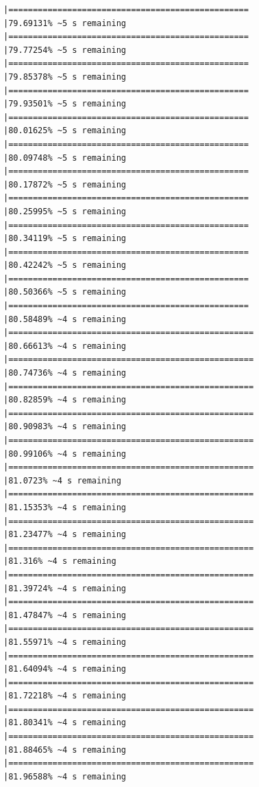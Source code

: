 \documentclass{article}\usepackage[]{graphicx}\usepackage[]{xcolor}
\makeatletter
\newenvironment{kframe}{%
 \def\at@end@of@kframe{}%
 \ifinner\ifhmode%
  \def\at@end@of@kframe{\end{minipage}}%
  \begin{minipage}{\columnwidth}%
 \fi\fi%
 \def\FrameCommand##1{\hskip\@totalleftmargin \hskip-\fboxsep
 \colorbox{shadecolor}{##1}\hskip-\fboxsep
     \hskip-\linewidth \hskip-\@totalleftmargin \hskip\columnwidth}%
 \MakeFramed {\advance\hsize-\width
   \@totalleftmargin\z@ \linewidth\hsize
   \@setminipage}}%
 {\par\unskip\endMakeFramed%
 \at@end@of@kframe}
\newenvironment{knitrout}{}{} %
\makeatother
\begin{document}
\begin{knitrout}
\begin{kframe}
\begin{verbatim}
|=================================================             |79.69131% ~5 s remaining  
|=================================================             |79.77254% ~5 s remaining  
|=================================================             |79.85378% ~5 s remaining  
|=================================================             |79.93501% ~5 s remaining  
|=================================================             |80.01625% ~5 s remaining  
|=================================================             |80.09748% ~5 s remaining  
|=================================================             |80.17872% ~5 s remaining  
|=================================================             |80.25995% ~5 s remaining  
|=================================================             |80.34119% ~5 s remaining  
|=================================================             |80.42242% ~5 s remaining  
|=================================================             |80.50366% ~5 s remaining  
|=================================================             |80.58489% ~4 s remaining  
|==================================================            |80.66613% ~4 s remaining  
|==================================================            |80.74736% ~4 s remaining  
|==================================================            |80.82859% ~4 s remaining  
|==================================================            |80.90983% ~4 s remaining  
|==================================================            |80.99106% ~4 s remaining  
|==================================================            |81.0723% ~4 s remaining   
|==================================================            |81.15353% ~4 s remaining  
|==================================================            |81.23477% ~4 s remaining  
|==================================================            |81.316% ~4 s remaining    
|==================================================            |81.39724% ~4 s remaining  
|==================================================            |81.47847% ~4 s remaining  
|==================================================            |81.55971% ~4 s remaining  
|==================================================            |81.64094% ~4 s remaining  
|==================================================            |81.72218% ~4 s remaining  
|==================================================            |81.80341% ~4 s remaining  
|==================================================            |81.88465% ~4 s remaining  
|==================================================            |81.96588% ~4 s remaining  

\end{verbatim}
\end{kframe}
\end{knitrout}
\end{document}
